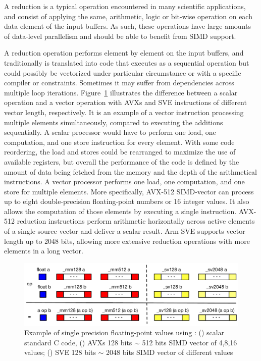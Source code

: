 \documentclass[5p,times,twocolumn]{elsarticle}
\begin{document}
A reduction is a typical operation encountered in many scientific applications, and consist of applying the same, arithmetic, logic or bit-wise operation on each data element of the input buffers. As such, these operations have large amounts of data-level parallelism and should be able
to benefit from SIMD support.

%
A reduction operation performs element by element on the input buffers,
and traditionally is translated into code that executes as a sequential operation but could possibly be vectorized
under particular circumstance or with a specific compiler or constraints. Sometimes
it may suffer from dependencies across multiple loop iterations.
%
Figure~\ref{fig:sseavx} illustrates the difference between a scalar operation and
a vector operation with AVXs and SVE instructions of different vector length, respectively.
%
It is an example of a vector instruction processing multiple elements simultaneously,
compared to executing the additions sequentially. A scalar processor would have to perform one load,
one computation, and one store instruction for every element. With some code reordering, the load and stores could be rearranged to maximize the use of available registers, but overall the performance of the code is defined by the amount of data being fetched from the memory and the depth of the arithmetical instructions. A vector processor performs one load,
one computation, and one store for multiple elements.
More specifically, AVX-512 SIMD-vector can process up to eight double-precision floating-point numbers or 16 integer values. It also allows the computation of those elements by executing a single instruction.
AVX-512 reduction instructions perform arithmetic horizontally across active elements of a
single source vector and deliver a scalar result. Arm SVE supports vector length up to 2048 bits,
allowing more extensive reduction operations with more elements in a long vector.

\begin{figure}[h]
    \centering
    \includegraphics[width=\linewidth]{sse_avx.pdf}
    \caption{Example of single precision floating-point values using : (\colorbox{blue}{})
    scalar standard C code,
    (\colorbox{red}{}) AVXs 128 bits $\sim$ 512 bits SIMD vector of 4,8,16 values;
    (\colorbox{yellow}{}) SVE 128 bits $\sim$ 2048 bits SIMD vector of different values}
    \label{fig:sseavx}
\end{figure}
\end{document}

